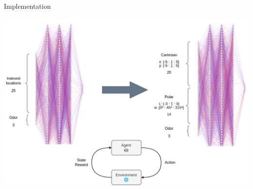 \documentclass[bigger]{beamer}
\begin{document}
\begin{frame}[label={sec:org5cd5afd}]{Implementation}
\begin{center}
\includegraphics[width=.9\linewidth]{img/nn.drawio.png}
\end{center}
\end{frame}
\end{document}
